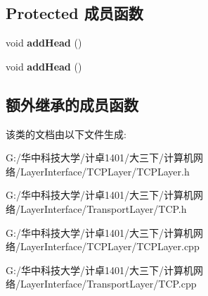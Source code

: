 \subsection*{Protected 成员函数}
\begin{DoxyCompactItemize}
\item 
\mbox{\label{class_c_t_c_p_a0c68800a3b6317cbe74aa2cb28ea3d9c}} 
void {\bfseries add\+Head} ()
\item 
\mbox{\label{class_c_t_c_p_a0c68800a3b6317cbe74aa2cb28ea3d9c}} 
void {\bfseries add\+Head} ()
\end{DoxyCompactItemize}
\subsection*{额外继承的成员函数}


该类的文档由以下文件生成\+:\begin{DoxyCompactItemize}
\item 
G\+:/华中科技大学/计卓1401/大三下/计算机网络/\+Layer\+Interface/\+T\+C\+P\+Layer/T\+C\+P\+Layer.\+h\item 
G\+:/华中科技大学/计卓1401/大三下/计算机网络/\+Layer\+Interface/\+Transport\+Layer/T\+C\+P.\+h\item 
G\+:/华中科技大学/计卓1401/大三下/计算机网络/\+Layer\+Interface/\+T\+C\+P\+Layer/T\+C\+P\+Layer.\+cpp\item 
G\+:/华中科技大学/计卓1401/大三下/计算机网络/\+Layer\+Interface/\+Transport\+Layer/T\+C\+P.\+cpp\end{DoxyCompactItemize}
